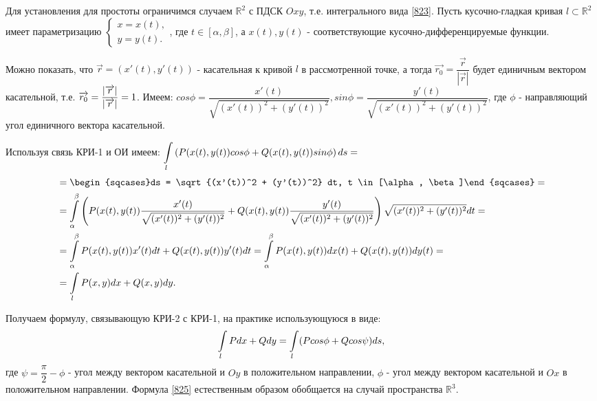 Для установления  для простоты ограничимся случаем $\mathbb{R}^2$ с ПДСК $Oxy$, т.е. интегрального вида \eqref{823}. Пусть кусочно-гладкая кривая $l \subset \mathbb{R}^2$ имеет параметризацию
$\begin{cases}
x = x(t),\\ y = y(t).
\end{cases}$, где $t \in [\alpha, \beta]$, а $x(t), y(t)$ - соответствующие кусочно-дифференцируемые функции. 

Можно показать, что $\overrightarrow{r} = (x'(t), y'(t))$ - касательная к кривой $l$ в рассмотренной точке, а тогда $\overrightarrow{r_0} = \dfrac{\overrightarrow{r}}{|\overrightarrow{r}|}$ будет единичным вектором касательной, т.е. $\overrightarrow{r_0} =  \dfrac{\left\lvert \overrightarrow{r} \right\rvert}{|\overrightarrow{r}|} = 1$. Имеем: $cos \phi = \dfrac{x'(t)}{\sqrt{(x'(t))^2 + (y'(t))^2}}, sin \phi = \dfrac{y'(t)}{\sqrt{(x'(t))^2 + (y'(t))^2}}$, где $\phi$ - направляющий угол единичного вектора касательной. 

Используя связь КРИ-1 и ОИ имеем: $\displaystyle\int\limits_l \left(P(x(t), y(t)) cos \phi + Q(x(t), y(t) ) sin \phi \right) ds = $
\begin{equation*}
\begin{split}
& = \begin{sqcases}ds = \sqrt{(x'(t))^2 + (y'(t))^2} dt, t \in [\alpha, \beta]\end{sqcases} = \\
& = \dint\limits_{\alpha}^{\beta} \left(P(x(t), y(t)) \dfrac{x'(t)}{{\sqrt{(x'(t))^2 + (y'(t))^2}}} + Q(x(t), y(t)) \dfrac{y'(t)}{\sqrt{(x'(t))^2 + (y'(t))^2}} \right) \sqrt{(x'(t))^2 + (y'(t))^2} dt = \\
& = \dint\limits_{\alpha}^{\beta} P(x(t), y(t)) x'(t)dt + Q(x(t), y(t)) y'(t)dt = \dint\limits_{\alpha}^{\beta} P(x(t), y(t)) dx(t) + Q(x(t), y(t)) dy(t) = \\
& = \dint\limits_l P(x,y) dx + Q(x,y)dy.
\end{split}
\end{equation*}

Получаем формулу, связывающую КРИ-2 с КРИ-1, на практике использующуюся в виде:
\begin{equation}
\label{825}
\displaystyle\int\limits_l Pdx + Qdy = \displaystyle\int\limits_l (P cos \phi + Q cos \psi) ds,
\end{equation}
где $\psi = \dfrac{\pi}{2} - \phi$ - угол между вектором касательной и $Oy$ в положительном направлении, $\phi$ - угол между вектором касательной и $Ox$ в положительном направлении. Формула \eqref{825} естественным образом обобщается на случай пространства $\mathbb{R}^3$. 

